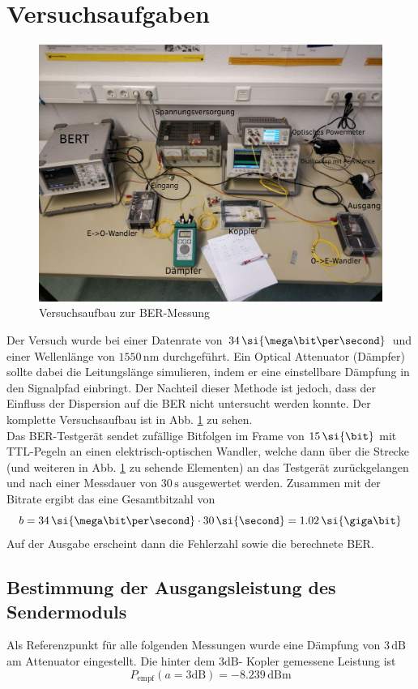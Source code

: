 \documentclass[11pt, a4paper]{article}
\newcommand{\dBm}{\si{\deci\bel}\text{m}}
\begin{document}
\section{Versuchsaufgaben}

\begin{figure}[H]
  \centering
  \includegraphics[width=\textwidth]{graphics/beepop}
  \caption{Versuchsaufbau zur BER-Messung}\label{aufbau}
\end{figure}

Der Versuch wurde bei einer Datenrate von $34 \, \si{\mega\bit\per\second}$ und
einer Wellenlänge von $1550 \, \si{\nano\meter}$ durchgeführt. Ein Optical
Attenuator (Dämpfer) sollte dabei die Leitungslänge simulieren, indem er eine
einstellbare Dämpfung in den Signalpfad einbringt. Der Nachteil dieser Methode
ist jedoch, dass der Einfluss der Dispersion auf die BER nicht untersucht werden
konnte. Der komplette Versuchsaufbau ist in Abb. \ref{aufbau} zu sehen.\\

Das BER-Testgerät sendet zufällige Bitfolgen im Frame von $15 \, \si{\bit}$ mit
TTL-Pegeln an einen elektrisch-optischen Wandler, welche dann über die
Strecke (und weiteren in Abb. \ref{aufbau} zu sehende Elementen) an das
Testgerät zurückgelangen und nach einer Messdauer von $30 \, \si{\second}$
ausgewertet werden. Zusammen mit der Bitrate ergibt das eine Gesamtbitzahl von
\[b = 34 \, \si{\mega\bit\per\second} \cdot 30 \, \si{\second} = 1.02 \,
  \si{\giga\bit}\]
Auf der Ausgabe erscheint dann die Fehlerzahl sowie die
berechnete BER.

\subsection{Bestimmung der Ausgangsleistung des Sendermoduls}\label{41}
Als Referenzpunkt für alle folgenden Messungen wurde eine Dämpfung von $3 \,
\si{\deci\bel}$ am Attenuator eingestellt. Die hinter dem $3 \si{\deci\bel}$-
Kopler gemessene Leistung ist
\[P_{\text{empf}}(a=3\si{\deci\bel}) = -8.239 \, \dBm\]
\end{document}
